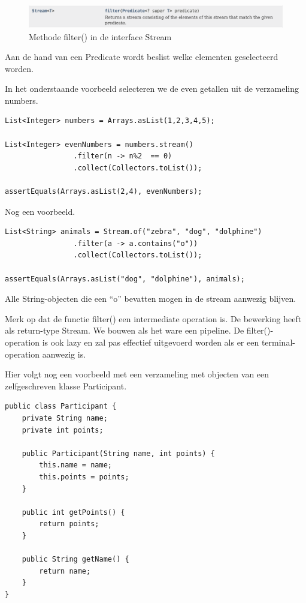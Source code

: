\begin{figure}[H]
  \includegraphics[width=\linewidth]{images/chapter_streams/stream_filter.png}
  \caption{Methode filter() in de interface Stream}
  \label{fig:stream_filters}
\end{figure}

Aan de hand van een Predicate wordt beslist welke elementen geselecteerd worden. 

In het onderstaande voorbeeld selecteren we de even getallen uit de verzameling numbers.

\begin{lstlisting}
List<Integer> numbers = Arrays.asList(1,2,3,4,5);

List<Integer> evenNumbers = numbers.stream()
				.filter(n -> n%2  == 0)
				.collect(Collectors.toList());
				
assertEquals(Arrays.asList(2,4), evenNumbers);
\end{lstlisting}

Nog een voorbeeld.

\begin{lstlisting}
List<String> animals = Stream.of("zebra", "dog", "dolphine")
				.filter(a -> a.contains("o"))
				.collect(Collectors.toList());

assertEquals(Arrays.asList("dog", "dolphine"), animals);
\end{lstlisting}

Alle String-objecten die een ``o'' bevatten mogen in de stream aanwezig blijven.

Merk op dat de functie filter() een intermediate operation is. De bewerking heeft als return-type Stream. We bouwen als het ware een pipeline. De filter()-operation is ook lazy en zal pas effectief uitgevoerd worden als er een terminal-operation aanwezig is.

Hier volgt nog een voorbeeld met een verzameling met objecten van een zelfgeschreven klasse Participant.

\begin{lstlisting}
public class Participant {
	private String name;
	private int points;

	public Participant(String name, int points) {
		this.name = name;
		this.points = points;
	}

	public int getPoints() {
		return points;
	}

	public String getName() {
		return name;
	}
}
\end{lstlisting}

